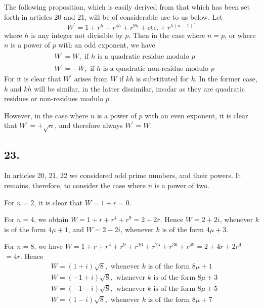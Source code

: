 \documentclass[twoside,12pt]{memoir}
\begin{document}
The following proposition, which is easily derived from that which has been set forth in articles 20 and 21, will be of considerable use to us below. Let
\[W^{\prime}=1+r^{h}+r^{4 h}+r^{9 h}+\text{etc{.}}+r^{h(n-1)^{2}}\]\pagebreak%
where \(h\) is any integer not divisible by \(p\).  Then in the case where \(n=p\), or where \(n\) is a power of \(p\) with an odd exponent, we have
\[\begin{aligned}
& W^{\prime}=W, \text{ if } h \text{ is a quadratic residue modulo } p \\
& W^{\prime}=-W, \text{ if } h \text{ is a quadratic non-residue modulo } p
\end{aligned}\]
For it is clear that \(W^{\prime}\) arises from \(W\) if \(kh\) is substituted for \(k\).  In the former case, \(k\) and \(kh\) will be similar, in the latter dissimilar, insofar as they are quadratic residues or non-residues modulo \(p\).

However, in the case where \(n\) is a power of \(p\) with an even exponent, it is clear that \(W^{\prime}=+\sqrt{n}\), and therefore always \(W^{\prime}=W\).

\subsection*{23.}
 
In articles 20, 21, 22 we considered odd prime numbers, and their powers.  It remains, therefore, to consider the case where \(n\) is a power of two.
 
For \(n=2\), it is clear that \(W=1+r=0\).
 
For \(n=4\), we obtain \(W=1+r+r^{4}+r^{9}=2+2 r\).  Hence \(W=2+2 i\), whenever \(k\) is of the form \(4 \mu+1\), and \(W=2-2 i\), whenever \(k\) is of the form \(4 \mu+3\).
 
For \(n=8\), we have \(W=1+r+r^{4}+r^{9}+r^{16}+r^{25}+r^{36}+r^{49}=2+4 r+2 r^{4}\) \(=4 r\). Hence
\[\begin{aligned}
& W=(1+i) \sqrt{8}, \text{ whenever } k \text{ is of the form } 8 \mu+1 \\
& W=(-1+i) \sqrt{8}, \text{ whenever } k \text{ is of the form } 8 \mu+3 \\
& W=(-1-i) \sqrt{8}, \text{ whenever } k \text{ is of the form } 8 \mu+5 \\
& W=(1-i) \sqrt{8}, \text{ whenever } k \text{ is of the form } 8 \mu+7
\end{aligned}\]
\end{document}
